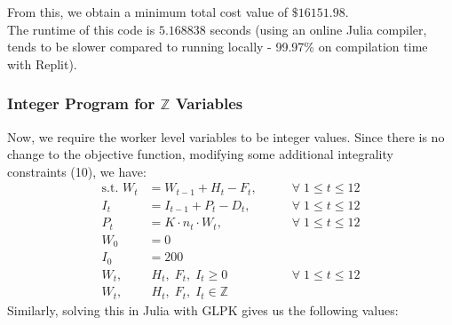 \documentclass[12pt]{article}
\begin{document}
\noindent From this, we obtain a minimum total cost value of $\boxed{\$ 16151.98}$. \\ 

\noindent The runtime of this code is $\boxed{5.168838}$ seconds (using an online Julia compiler, tends to be slower compared to running locally - 99.97\% on compilation time with Replit).

\subsubsection*{Integer Program for $ \mathbb{Z}$ Variables}

Now, we require the worker level variables to be integer values. Since there is no change to the objective function, modifying some additional integrality constraints (10), we have: \begin{align}
    \text{s.t. } W_t &= W_{t-1} + H_t - F_t, \qquad &\forall \; 1 \leq t \leq 12 \\ 
    I_t &= I_{t-1} + P_t - D_t, \qquad &\forall \; 1\leq t\leq 12 \\ 
    P_t &= K\cdot n_{t}\cdot W_t, \qquad &\forall \; 1\leq t\leq 12 \\ \nonumber
    W_{0} &= 0 \\ \nonumber
    I_{0} &= 200 \\ 
    W_t, &\;  H_t, \; F_t, \; I_t \geq 0 \qquad &\forall \; 1 \leq t \leq 12 \\ 
    W_t, &\;  H_t, \; F_t, \; I_t \in \mathbb{Z}
\end{align} Similarly, solving this in Julia with GLPK gives us the following values:
\end{document}
